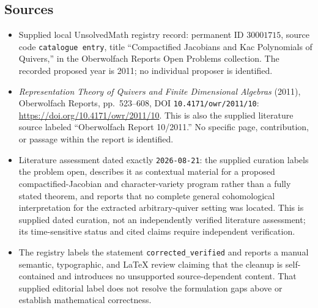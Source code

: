\documentclass[11pt]{article}
\begin{document}
\subsection{Sources}
\begin{itemize}
\item Supplied local UnsolvedMath registry record: permanent ID \(30001715\), source code \texttt{catalogue entry}, title ``Compactified Jacobians and Kac Polynomials of Quivers,'' in the Oberwolfach Reports Open Problems collection. The recorded proposed year is 2011; no individual proposer is identified.
\item \emph{Representation Theory of Quivers and Finite Dimensional Algebras} (2011), Oberwolfach Reports, pp.\ 523--608, DOI \texttt{10.4171/owr/2011/10}: \url{https://doi.org/10.4171/owr/2011/10}. This is also the supplied literature source labeled ``Oberwolfach Report 10/2011.'' No specific page, contribution, or passage within the report is identified.
\item Literature assessment dated exactly \texttt{2026-08-21}: the supplied curation labels the problem open, describes it as contextual material for a proposed compactified-Jacobian and character-variety program rather than a fully stated theorem, and reports that no complete general cohomological interpretation for the extracted arbitrary-quiver setting was located. This is supplied dated curation, not an independently verified literature assessment; its time-sensitive status and cited claims require independent verification.
\item The registry labels the statement \texttt{corrected\_verified} and reports a manual semantic, typographic, and LaTeX review claiming that the cleanup is self-contained and introduces no unsupported source-dependent content. That supplied editorial label does not resolve the formulation gaps above or establish mathematical correctness.
\end{itemize}
\end{document}
